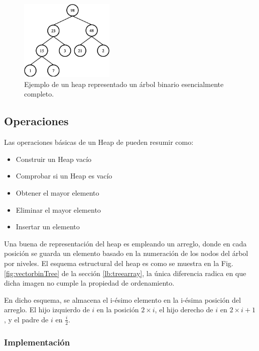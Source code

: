 \begin{figure}[htpb!]
  \begin{center}
    \includegraphics[width=0.4\textwidth]{images/heap.eps}
  \end{center}
  \caption{Ejemplo de un heap representado un árbol binario esencialmente completo.}
  \label{fig:Heap1}
\end{figure}

\subsection{Operaciones}

Las operaciones básicas de un Heap de pueden resumir como:
\begin{itemize}
\item Construir un Heap vacío
\item Comprobar si un Heap es vacío
\item Obtener el mayor elemento
\item Eliminar el mayor elemento
\item Insertar un elemento
\end{itemize}

Una buena de representación del heap es empleando un arreglo, donde en cada posición se guarda un elemento basado en la numeración de los nodos del árbol por niveles. El esquema estructural del heap es como se muestra en la Fig. \ref{fig:vectorbinTree} de la sección \ref{lb:treearray}, la única diferencia radica en que dicha imagen no cumple la propiedad de ordenamiento.

En dicho esquema, se almacena el i-ésimo elemento en la i-ésima posición del arreglo. El hijo izquierdo de $i$ en la posición $2 \times i$, el hijo derecho de $i$ en $2 \times i+1$, y el padre de $i$ en $\frac{i}{2}$.

\subsubsection{Implementación}

